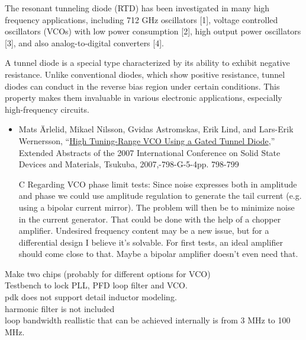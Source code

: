 \documentclass{article}
\begin{document}
\begin{info}
	The resonant tunneling diode (RTD) has been investigated in many high frequency applications, including 712 GHz oscillators [1], voltage controlled oscillators (VCOs) with low power consumption [2], high output power oscillators [3], and also analog-to-digital converters [4].
\end{info}

A tunnel diode is a special type characterized by its ability to exhibit negative resistance. Unlike conventional diodes, which show positive resistance, tunnel diodes can conduct in the reverse bias region under certain conditions. This property makes them invaluable in various electronic applications, especially high-frequency circuits.

\begin{itemize}
	\item Mats Ärlelid, Mikael Nilsson, Gvidas Astromskas, Erik Lind, and Lars-Erik Wernersson, “\href{https://confit.atlas.jp/guide/event-img/ssdm2007/G-5-4/public/pdf_archive?type=in}{High Tuning-Range VCO Using a Gated Tunnel Diode},” Extended Abstracts of the 2007 International Conference on Solid State Devices and Materials, Tsukuba, 2007,-798-G-5-4pp. 798-799
	\item [C] Regarding VCO phase limit tests: Since noise expresses both in amplitude and phase we could use amplitude regulation to generate the tail current (e.g. using a bipolar current mirror). The problem will then be to minimize noise in the current generator. That could be done with the help of a chopper amplifier. Undesired frequency content may be a new issue, but for a differential design I believe it's solvable. For first tests, an ideal amplifier should come close to that. Maybe a bipolar amplifier doesn't even need that. 
\end{itemize}

Make two chips (probably for different options for VCO)
\\
Testbench to lock PLL, PFD loop filter and VCO.
\\

pdk does not support detail inductor modeling.
\\

harmonic filter is not included
\\

loop bandwidth reallistic that can be achieved internally is from 3 MHz to 100 MHz.
\\
\end{document}
